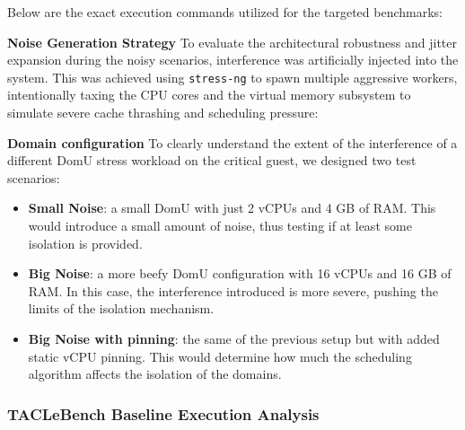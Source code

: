 Below are the exact execution commands utilized for the targeted
benchmarks:

\begin{Shaded}
\begin{Highlighting}[]
\end{Highlighting}
\end{Shaded}

\textbf{Noise Generation Strategy} To evaluate the architectural
robustness and jitter expansion during the noisy scenarios, interference
was artificially injected into the system. This was achieved using
\texttt{stress-ng} to spawn multiple aggressive workers, intentionally
taxing the CPU cores and the virtual memory subsystem to simulate severe
cache thrashing and scheduling pressure:

\begin{Shaded}
\begin{Highlighting}[]
\end{Highlighting}
\end{Shaded}

\textbf{Domain configuration} To clearly understand the extent of the
interference of a different DomU stress workload on the critical guest,
we designed two test scenarios:

\begin{itemize}
\item
  \textbf{Small Noise}: a small DomU with just 2 vCPUs and 4 GB of RAM.
  This would introduce a small amount of noise, thus testing if at least
  some isolation is provided.
\item
  \textbf{Big Noise}: a more beefy DomU configuration with 16 vCPUs and
  16 GB of RAM. In this case, the interference introduced is more
  severe, pushing the limits of the isolation mechanism.
\item
  \textbf{Big Noise with pinning}: the same of the previous setup but
  with added static vCPU pinning. This would determine how much the
  scheduling algorithm affects the isolation of the domains.
\end{itemize}

\subsubsection{TACLeBench Baseline Execution
Analysis}\label{taclebench-baseline-execution-analysis-1}

